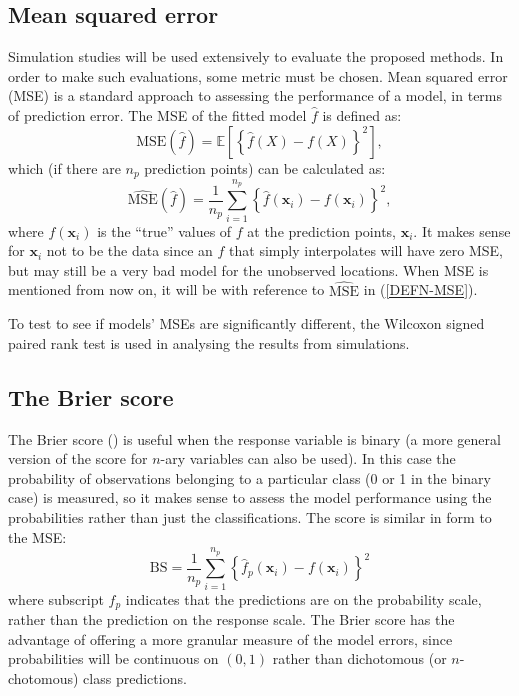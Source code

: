 \subsection{Mean squared error}

Simulation studies will be used extensively to evaluate the proposed methods. In order to make such evaluations, some metric must be chosen. Mean squared error (MSE) is a standard approach to assessing the performance of a model, in terms of prediction error. The MSE of the fitted model $\hat{f}$ is defined as:
\begin{equation*}
\text{MSE}(\hat{f}) = \mathbb{E}\left [\left \{ \hat{f}(X) - f(X) \right \}^2 \right ],
\end{equation*}
which (if there are $n_p$ prediction points) can be calculated as:
\begin{equation}
\widehat{\text{MSE}}(\hat{f}) = \frac{1}{n_p} \sum_{i=1}^{n_p} \left \{\hat{f}(\mathbf{x}_i) - f(\mathbf{x}_i) \right \}^2,
\label{DEFN-MSE}
\end{equation}
where $f(\mathbf{x}_i)$ is the ``true'' values of $f$ at the prediction points, $\mathbf{x}_i$.  It makes sense for $\mathbf{x}_i$ not to be the data since an $\hat{f}$ that simply interpolates will have zero MSE, but may still be a very bad model for the unobserved locations. When MSE is mentioned from now on, it will be with reference to $\widehat{\text{MSE}}$ in (\ref{DEFN-MSE}).

To test to see if models' MSEs are significantly different, the Wilcoxon signed paired rank test is used in analysing the results from simulations.

\subsection{The Brier score}
\label{DEFN-brier}

The Brier score (\cite{brier50}) is useful when the response variable is binary (a more general version of the score for $n$-ary variables can also be used). In this case the probability of observations belonging to a particular class (0 or 1 in the binary case) is measured, so it makes sense to assess the model performance using the probabilities rather than just the classifications. The score is similar in form to the MSE:
\begin{equation}
\text{BS} = \frac{1}{n_p} \sum_{i=1}^{n_p} \left \{\hat{f}_p(\mathbf{x}_i)-f(\mathbf{x}_i) \right \}^2
\end{equation}
where subscript $f_p$ indicates that the predictions are on the probability scale, rather than the prediction on the response scale. The Brier score has the advantage of offering a more granular measure of the model errors, since probabilities will be continuous on $(0,1)$ rather than dichotomous (or $n$-chotomous) class predictions.

